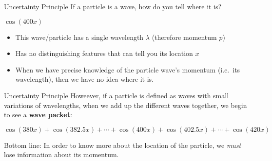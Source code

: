 \documentclass[12pt,compress,aspectratio=169]{beamer}
\begin{document}
\begin{frame}{Uncertainty Principle}
  If a particle is a wave, how do you tell where it is?
  \begin{center}
    
    {\footnotesize $\cos(400x)$}
  \end{center}
  \begin{itemize}
  \item This wave/particle has a single wavelength $\lambda$ (therefore
    momentum $p$)
  \item Has no distinguishing features that can tell you its location $x$
  \item When we have precise knowledge of the particle wave's momentum (i.e.\
    its wavelength), then we have no idea where it is.
  \end{itemize} 
\end{frame}

\begin{frame}{Uncertainty Principle}
  Howeever, if a particle is defined as waves with small variations of
  wavelengths, when we add up the different waves together, we begin to see a
  \textbf{wave packet}:
  \begin{center}

    {\footnotesize
      $\cos(380x)+\cos(382.5x)+\cdots+\cos(400x)+
      \cos(402.5x)+\cdots+\cos(420x)$}
  \end{center}
  Bottom line: In order to know more about the location of the particle, we
  \emph{must} lose information about its momentum.
\end{frame}
\end{document}
